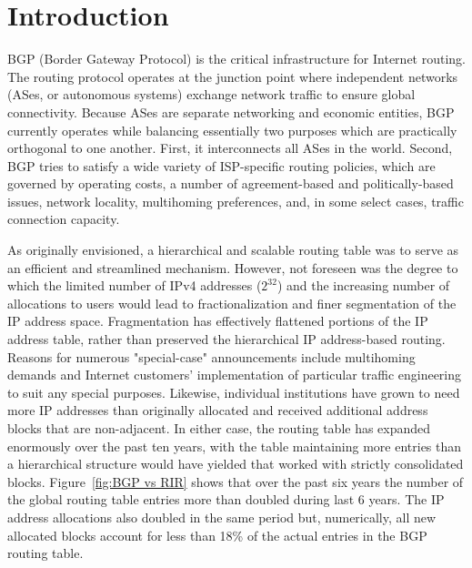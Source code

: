 \section{Introduction}

BGP (Border Gateway Protocol) \cite{Rekhter:1995:RFC1771-BGP} is the critical
infrastructure for Internet routing. The routing protocol operates at the
junction point where independent networks (ASes, or autonomous systems)
exchange network traffic to ensure global connectivity. Because ASes are
separate networking and economic entities, BGP currently operates while
balancing essentially two purposes which are practically orthogonal to one
another. First, it interconnects all ASes in the world. Second, BGP tries to
satisfy a wide variety of ISP-specific routing policies, which are governed by
operating costs, a number of agreement-based and politically-based issues,
network locality, multihoming preferences, and, in some select cases, traffic
connection capacity. 


As originally envisioned, a hierarchical and scalable routing table was to
serve as an efficient and streamlined mechanism. However, not foreseen was the
degree to which the limited number of IPv4 addresses ($2^{32}$) and the
increasing number of allocations to users would lead to fractionalization and
finer segmentation of the IP address space. Fragmentation has effectively
flattened portions of the IP address table, rather than preserved the
hierarchical IP address-based routing. Reasons for numerous "special-case"
announcements include multihoming demands and Internet customers'
implementation of particular traffic engineering to suit any special purposes.
Likewise, individual institutions have grown to need more IP addresses than
originally allocated and received additional address blocks that are
non-adjacent. In either case, the routing table has expanded enormously over
the past ten years, with the table maintaining more entries than a
hierarchical structure would have yielded that worked with strictly
consolidated blocks. Figure~\ref{fig:BGP vs RIR} shows that over the past six
years the number of the global routing table entries more than doubled during
last 6 years. The IP address allocations also doubled in the same period but,
numerically, all new allocated blocks account for less than 18\% of the actual
entries in the BGP routing table. 

